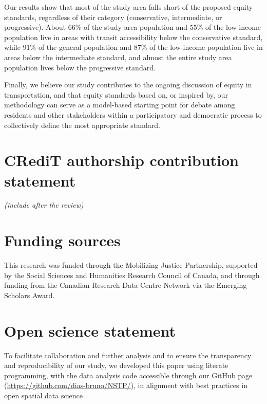 \documentclass[preprint, 3p,
authoryear]{elsarticle} %
\begin{document}
Our results show that most of the study area falls short of the proposed
equity standards, regardless of their category (conservative,
intermediate, or progressive). About 66\% of the study area population
and 55\% of the low-income population live in areas with transit
accessibility below the conservative standard, while 91\% of the general
population and 87\% of the low-income population live in areas below the
intermediate standard, and almost the entire study area population lives
below the progressive standard.

Finally, we believe our study contributes to the ongoing discussion of
equity in transportation, and that equity standards based on, or
inspired by, our methodology can serve as a model-based starting point
for debate among residents and other stakeholders within a participatory
and democratic process to collectively define the most appropriate
standard.

\section*{CRediT authorship contribution
statement}\label{credit-authorship-contribution-statement}

\emph{(include after the review)}

\section*{Funding sources}\label{funding-sources}

This research was funded through the Mobilizing Justice Partnership,
supported by the Social Sciences and Humanities Research Council of
Canada, and through funding from the Canadian Research Data Centre
Network via the Emerging Scholars Award.

\section*{Open science statement}\label{open-science-statement}

To facilitate collaboration and further analysis and to ensure the
transparency and reproducibility of our study, we developed this paper
using literate programming, with the data analysis code accessible
through our GitHub page (\url{https://github.com/dias-bruno/NSTP/}), in
alignment with best practices in open spatial data science
\citep{páez2021, arribas-bel2021}.
\end{document}
